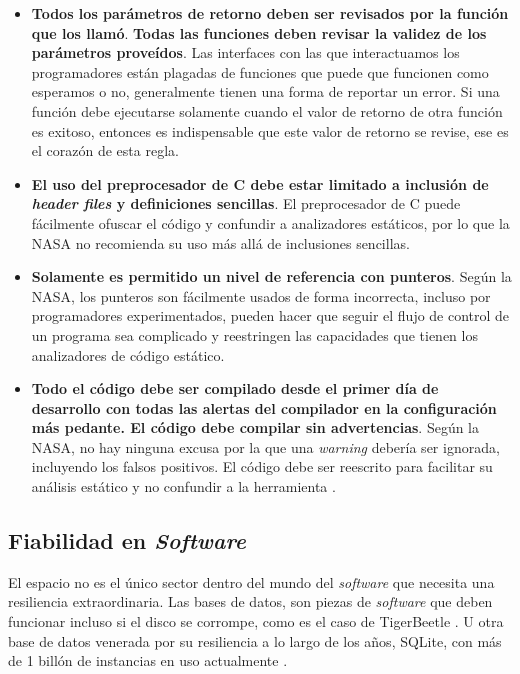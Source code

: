 \begin{itemize}
  \item {\textbf{Todos los parámetros de retorno deben ser revisados por la función que los llamó}. \textbf{Todas las funciones deben revisar la validez de los parámetros proveídos}. Las interfaces con las que interactuamos los programadores están plagadas de funciones que puede que funcionen como esperamos o no, generalmente tienen una forma de reportar un error. Si una función debe ejecutarse solamente cuando el valor de retorno de otra función es exitoso, entonces es indispensable que este valor de retorno se revise, ese es el corazón de esta regla.}
  \item {\textbf{El uso del preprocesador de C debe estar limitado a inclusión de \textit{header files} y definiciones sencillas}. El preprocesador de C puede fácilmente ofuscar el código y confundir a analizadores estáticos, por lo que la NASA no recomienda su uso más allá de inclusiones sencillas.}
  \item {\textbf{Solamente es permitido un nivel de referencia con punteros}. Según la NASA, los punteros son fácilmente usados de forma incorrecta, incluso por programadores experimentados, pueden hacer que seguir el flujo de control de un programa sea complicado y reestringen las capacidades que tienen los analizadores de código estático.}
  \item {\textbf{Todo el código debe ser compilado desde el primer día de desarrollo con todas las alertas del compilador en la configuración más pedante. El código debe compilar sin advertencias}. Según la NASA, no hay ninguna excusa por la que una \textit{warning} debería ser ignorada, incluyendo los falsos positivos. El código debe ser reescrito para facilitar su análisis estático y no confundir a la herramienta \cite{holzmann_2006}.}
	\end{itemize}

	\subsection{Fiabilidad en \textit{Software}} \label{sec:reliability}
  El espacio no es el único sector dentro del mundo del \textit{software} que necesita una resiliencia extraordinaria. Las bases de datos, son piezas de \textit{software} que deben funcionar incluso si el disco se corrompe, como es el caso de TigerBeetle \cite{greef_2026}. U otra base de datos venerada por su resiliencia a lo largo de los años, SQLite, con más de 1 billón de instancias en uso actualmente \cite{software_should_work_2026}.


